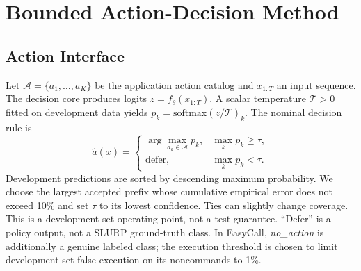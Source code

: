 \documentclass[conference]{IEEEtran}
\begin{document}
\section{Bounded Action-Decision Method}
\subsection{Action Interface}
Let $\mathcal A=\{a_1,\ldots,a_K\}$ be the application action catalog and $x_{1:T}$ an input sequence. The decision core produces logits $z=f_\theta(x_{1:T})$. A scalar temperature $\mathcal T>0$ fitted on development data yields $p_k=\mathrm{softmax}(z/\mathcal T)_k$. The nominal decision rule is
\begin{equation}
\hat a(x)=\begin{cases}
\arg\max_{a_k\in\mathcal A}p_k,&\max_k p_k\geq\tau,\\
\mathrm{defer},&\max_k p_k<\tau.
\end{cases}
\end{equation}
Development predictions are sorted by descending maximum probability. We choose the largest accepted prefix whose cumulative empirical error does not exceed 10\% and set $\tau$ to its lowest confidence. Ties can slightly change coverage. This is a development-set operating point, not a test guarantee. ``Defer'' is a policy output, not a SLURP ground-truth class. In EasyCall, \emph{no\_action} is additionally a genuine labeled class; the execution threshold is chosen to limit development-set false execution on its noncommands to 1\%.
\end{document}
